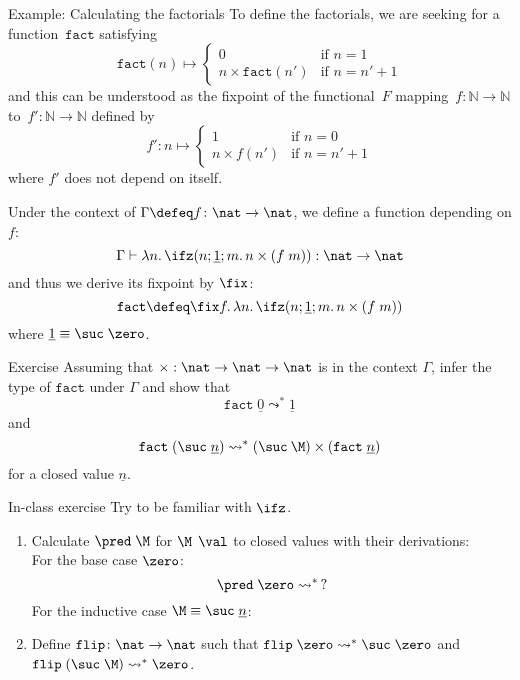 \begin{frame}{Example: Calculating the factorials}
  To define the factorials, we are seeking for a function~$\mathtt{fact}$ satisfying
  \[
    \mathtt{fact}(n) \mapsto
    \begin{cases}
      0 & \text{if } n = 1 \\
      n \times \mathtt{fact}(n') & \text{if } n = n' + 1
    \end{cases}
  \]
  and this can be understood as the fixpoint of the functional~$F$ mapping~$f
  \colon\mathbb{N} \to \mathbb{N}$ to~$f'\colon\mathbb{N}\to\mathbb{N}$ defined
  by
  \[
    \label{eq:factorial_informal}
    f'\colon n \mapsto
    \begin{cases}
      1 & \text{if } n = 0 \\
      n \times f(n') & \text{if } n = n' + 1
    \end{cases}
  \]
  where $f'$ does not depend on itself.
\end{frame}

\begin{frame}
  Under the context of $\Gamma \defeq f\colon \nat \to \nat$, we
  define a function depending on $f$:
  \[
    \Gamma \vdash \lambda n.\, \ifz(n; \underline{1}; m.\, n \times (f\; m))
      : \nat \to \nat
  \]
  and thus we derive its fixpoint by $\fix$:
  \[
    \mathtt{fact} \defeq
    \fix f.\, \lambda n .\, \ifz(n; \underline{1}; m .\, n\times (f\; m))
  \]
  where $\underline{1} \equiv \suc\;\zero$.
  \begin{block}{Exercise}
    Assuming that $\times : \nat\to\nat\to\nat$ is in the context $\Gamma$,
    infer the type of $\mathtt{fact}$ under $\Gamma$ and show that
    \[
      \mathtt{fact}\;\underline{0} \leadsto^* \underline{1}
    \]
    and 
    \[
      \mathtt{fact}\;(\suc\;\underline{n}) \leadsto^* (\suc\:\M) \times
      (\mathtt{fact}\;\underline{n})
    \]
    for a closed value $\underline{n}$. 
  \end{block}
\end{frame}
\begin{frame}{In-class exercise}
  Try to be familiar with $\ifz$.
  \begin{enumerate}
    \item Calculate $\pred\;\M$ for $\M \;\,\val$
      to closed values with their derivations: \\
      For the base case
      $\zero$:
      \[
        \pred\;\zero \leadsto^*\, ?
      \]
      For the inductive case $\M \equiv \suc\; \underline{n}$:
      \begin{prooftree}
      \end{prooftree}
    \item Define $\mathtt{flip}\colon \nat \to \nat$
      such that $\mathtt{flip}\;\zero \leadsto^* \suc\; \zero$
      and $\mathtt{flip}\; (\suc \;\M) \leadsto^* \zero$. 
  \end{enumerate}
\end{frame}


